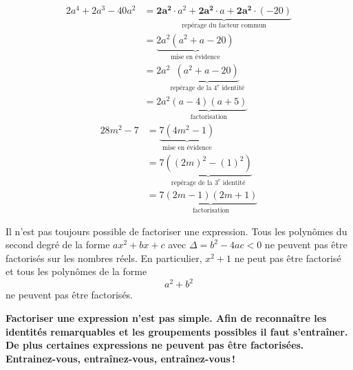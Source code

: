 \documentclass[a4paper,12pt]{report}
\begin{document}
\begin{tasks}
	\task 
	\vspace{-2em}
	\begin{align*}
		2a^4+2a^3-40a^2&=\underset{\text{repérage du facteur commun}}{\underbrace{\bm{2a^2}\cdot a^2+\bm{2a^2}\cdot a+\bm{2a^2}\cdot (-20)}}\\
			       &=\underset{\text{mise en évidence}}{\underbrace{2a^2(a^2+a-20)}}\\										 &=2a^2\underset{\text{repérage de la } 4^\text{e}\text{  identité}}{\underbrace{(a^2+a-20)}}\\
			       &=2a^2\underset{\text{factorisation}}{\underbrace{(a-4)(a+5)}}
	\end{align*}
	\task 
	\vspace{-2em}
	\begin{align*}
	28m^2-7&=\underset{\text{mise en évidence}}{\underbrace{7(4m^2-1)}}\\
	       &=7\underset{\text{repérage de la }3^\text{e}\text{  identité}}{\underbrace{((2m)^2-(1)^2)}}\\
	       &=7\underset{\text{factorisation}}{\underbrace{(2m-1)(2m+1)}}
	\end{align*}
\end{tasks}


\begin{rem}
	Il n'est pas toujours possible de factoriser une expression. Tous les polynômes du second degré de la forme $ax^2+bx+c$ avec $\Delta=b^2-4ac<0$ ne peuvent pas être factorisés sur les nombres réels. En particulier, $x^2+1$ ne peut pas être factorisé et tous les polynômes de la forme
	\[a^2+b^2\]
	ne peuvent pas être factorisés. 
\end{rem}

{\bfseries Factoriser une expression n'est pas simple. Afin de reconnaître les identités remarquables et les groupements possibles il faut s'entraîner. De plus certaines expressions ne peuvent pas être factorisées. Entrainez-vous, entraînez-vous, entraînez-vous\,!}
\end{document}
